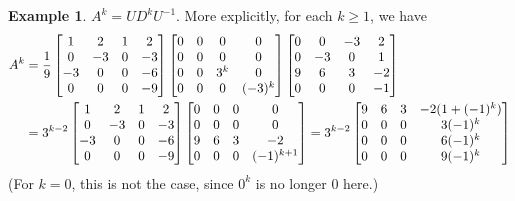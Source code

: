 \documentclass[reqno]{amsart}
\theoremstyle{definition}
\newtheorem{example}[theorem]{Example}
\begin{document}
\begin{example}
 $A^k=UD^kU^{-1}$.  More explicitly, for each $k \geq 1$, we have
 \begin{align*}
  A^k &= 
   \frac{1}{9}
   \left[\begin{matrix} 1 &  2 & 1 &  2 \\
        0 & -3 & 0 & -3 \\
       -3 &  0 & 0 & -6 \\
        0 &  0 & 0 & -9 \end{matrix}\right]
   \left[\begin{matrix} 0 & 0 & 0 &  0 \\
        0 & 0 & 0 &  0 \\
        0 & 0 & 3^k &  0 \\
        0 & 0 & 0 & (-3)^k \end{matrix}\right]
   \left[\begin{matrix} 0 &  0 & -3 &  2 \\
        0 & -3 &  0 &  1 \\ 
        9 &  6 &  3 & -2 \\ 
        0 &  0 &  0 & -1 \end{matrix}\right] \\
   &= 
   3^{k-2}
   \left[\begin{matrix} 1 &  2 & 1 &  2 \\
        0 & -3 & 0 & -3 \\
       -3 &  0 & 0 & -6 \\
        0 &  0 & 0 & -9 \end{matrix}\right]
   \left[\begin{matrix} 0 &  0 &  0 &  0 \\
        0 &  0 &  0 &  0 \\ 
        9 &  6 &  3 & -2 \\ 
        0 &  0 &  0 & (-1)^{k+1} \end{matrix}\right] 
   = 
   3^{k-2}
   \left[\begin{matrix} 9 &  6 &  3 & -2(1+(-1)^k) \\
        0 &  0 &  0 & 3(-1)^k \\
        0 &  0 &  0 & 6(-1)^k \\
        0 &  0 &  0 & 9(-1)^k \end{matrix}\right]
 \end{align*}
 (For $k = 0$, this is not the case, since $0^k$ is no
 longer $0$ here.)
\end{example}
\end{document}
